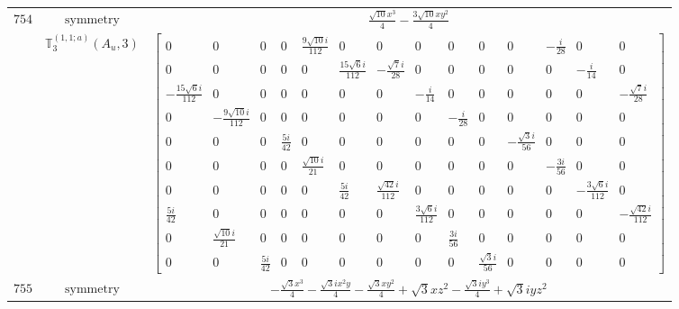 \documentclass[fleqn,8pt,landscape]{jsarticle}
\begin{document}
\begin{longtable}{ccc}
$ 754 $ & $ \text{symmetry} $ & $ \frac{\sqrt{10} x^{3}}{4} - \frac{3 \sqrt{10} x y^{2}}{4} $ \\
$  $ & $ \mathbb{T}_{3}^{(1,1;a)}(A_{u},3) $ & $ \begin{bmatrix} 0 & 0 & 0 & 0 & \frac{9 \sqrt{10} i}{112} & 0 & 0 & 0 & 0 & 0 & 0 & - \frac{i}{28} & 0 & 0 \\ 0 & 0 & 0 & 0 & 0 & \frac{15 \sqrt{6} i}{112} & - \frac{\sqrt{7} i}{28} & 0 & 0 & 0 & 0 & 0 & - \frac{i}{14} & 0 \\ - \frac{15 \sqrt{6} i}{112} & 0 & 0 & 0 & 0 & 0 & 0 & - \frac{i}{14} & 0 & 0 & 0 & 0 & 0 & - \frac{\sqrt{7} i}{28} \\ 0 & - \frac{9 \sqrt{10} i}{112} & 0 & 0 & 0 & 0 & 0 & 0 & - \frac{i}{28} & 0 & 0 & 0 & 0 & 0 \\ 0 & 0 & 0 & \frac{5 i}{42} & 0 & 0 & 0 & 0 & 0 & 0 & - \frac{\sqrt{3} i}{56} & 0 & 0 & 0 \\ 0 & 0 & 0 & 0 & \frac{\sqrt{10} i}{21} & 0 & 0 & 0 & 0 & 0 & 0 & - \frac{3 i}{56} & 0 & 0 \\ 0 & 0 & 0 & 0 & 0 & \frac{5 i}{42} & \frac{\sqrt{42} i}{112} & 0 & 0 & 0 & 0 & 0 & - \frac{3 \sqrt{6} i}{112} & 0 \\ \frac{5 i}{42} & 0 & 0 & 0 & 0 & 0 & 0 & \frac{3 \sqrt{6} i}{112} & 0 & 0 & 0 & 0 & 0 & - \frac{\sqrt{42} i}{112} \\ 0 & \frac{\sqrt{10} i}{21} & 0 & 0 & 0 & 0 & 0 & 0 & \frac{3 i}{56} & 0 & 0 & 0 & 0 & 0 \\ 0 & 0 & \frac{5 i}{42} & 0 & 0 & 0 & 0 & 0 & 0 & \frac{\sqrt{3} i}{56} & 0 & 0 & 0 & 0 \end{bmatrix} $ \\ \hline
$ 755 $ & $ \text{symmetry} $ & $ - \frac{\sqrt{3} x^{3}}{4} - \frac{\sqrt{3} i x^{2} y}{4} - \frac{\sqrt{3} x y^{2}}{4} + \sqrt{3} x z^{2} - \frac{\sqrt{3} i y^{3}}{4} + \sqrt{3} i y z^{2} $ \\

\end{longtable}
\end{document}
